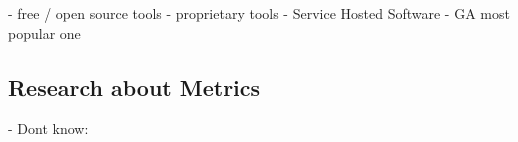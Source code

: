 - free / open source tools
- proprietary tools
- Service Hosted Software
- GA most popular one












\subsection{Research about Metrics}







- Dont know:























